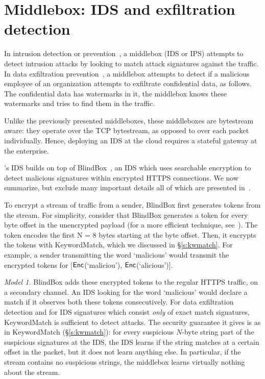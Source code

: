 


\section{Middlebox: IDS and exfiltration detection}\label{sec:ids}

In intrusion detection or prevention~\cite{Snort}, a middlebox (IDS or IPS) attempts to detect intrusion attacks by looking to match attack signatures against the traffic.
In data exfiltration prevention~\cite{CMU_exfiltration_report}, a middlebox attempts to detect if a malicious employee of an organization 
attempts to exfiltrate confidential data, as follows.  The confidential data has watermarks in it, the middlebox knows these watermarks and tries to find them
in the traffic. 

Unlike the previously presented middleboxes, these middleboxes are bytestream aware:  they operate over the TCP bytestream, as opposed to over each packet individually. Hence, deploying an IDS at the cloud requires a stateful gateway at the enterprise.

\sys's IDS builds on top of BlindBox~\cite{blindbox}, an IDS which uses searchable encryption to detect malicious signatures within encrypted HTTPS connections. We now  summarize, but exclude many important details all of which are presented in~\cite{blindbox}.

To encrypt a stream of traffic from a sender, BlindBox first generates tokens from the stream.  
For simplicity, consider that BlindBox generates a token for  every byte offset in the unencrypted payload (for a more efficient technique, see~\cite{blindbox}). 
The  token encodes the first N = 8 bytes starting at the byte offset. Then, it encrypts the tokens with KeywordMatch, which we discussed in \S\ref{s:kwmatch}.
For example, a sender transmitting the word `malicious' would transmit the encrypted tokens for [$\mathsf{Enc}$(`maliciou'), $\mathsf{Enc}$(`alicious')].

 {\em Model 1.} BlindBox adds these encrypted tokens to the  regular HTTPS traffic, on  a secondary channel.
An IDS looking for the word `malicious' would declare a match if it observes both these tokens consecutively.
For data exfiltration detection and for IDS signatures which consist {\it only} of exact match signatures, KeywordMatch is sufficient to detect attacks.
The security guarantee it gives is as in KeywordMatch (\S\ref{s:kwmatch}): for every suspicious $N$-byte string part of the suspicious signatures at the IDS, the IDS learns if the string matches at a certain offset in the packet, but it does not learn anything else. In particular, if the stream contains no suspicious strings, the middlebox learns virtually nothing about the stream. 

